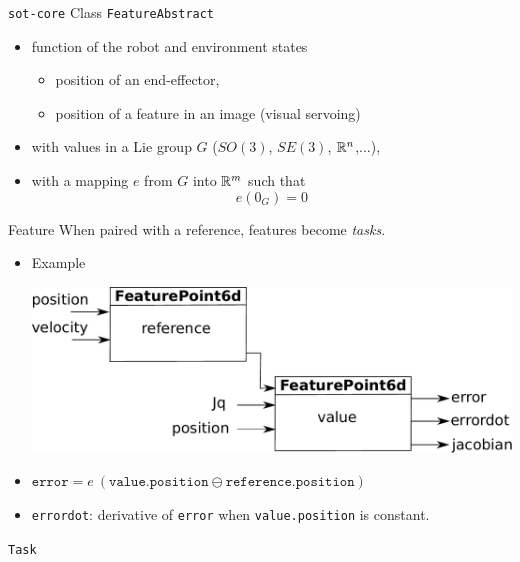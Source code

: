 %
%
\begin {frame} {\texttt{sot-core}}
Class \texttt {FeatureAbstract}
\begin{itemize}
\item function of the robot and environment states
  \pause
\begin{itemize}
  \item position of an end-effector,
  \item position of a feature in an image (visual servoing)
\end{itemize}
  \pause
\item with values in a Lie group $G$ ($SO(3)$, $SE(3)$, $\mathbb{R}^n$,...),
  \pause
\item with a mapping $e$ from $G$ into $\mathbb{R}^m$ such that
  $$ e (0_G) = 0$$
\end{itemize}
\end{frame}

%
%
\begin{frame} {Feature}
  When paired with a reference, features become \textit{tasks}.
  \begin{itemize}
    \item Example
      \centerline {
        \includegraphics [width=\linewidth]{figures/feature.pdf}
      }
      \pause
    \item $\texttt {error} = e\ (\texttt {value.position} \ominus \texttt {reference.position})$
      \pause
    \item \texttt{errordot}: derivative of \texttt {error} when \texttt{value.position} is constant.
  \end{itemize}
\end{frame}

%
% 
\begin{frame} {\texttt {Task}}
\end{frame}

